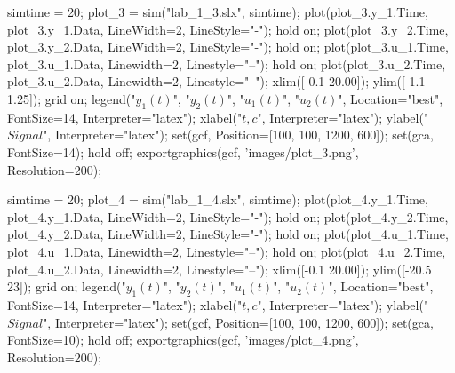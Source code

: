 



\begin{matlabcode}
simtime = 20;
plot_3 = sim("lab_1_3.slx", simtime);
plot(plot_3.y_1.Time, plot_3.y_1.Data, LineWidth=2, LineStyle="-");
hold on;
plot(plot_3.y_2.Time, plot_3.y_2.Data, LineWidth=2, LineStyle="-");
hold on;
plot(plot_3.u_1.Time, plot_3.u_1.Data, Linewidth=2, Linestyle="--");
hold on;
plot(plot_3.u_2.Time, plot_3.u_2.Data, Linewidth=2, Linestyle="--");
xlim([-0.1 20.00]);
ylim([-1.1 1.25]);
grid on;
legend("$y_1(t)$", "$y_2(t)$", "$u_1(t)$", "$u_2(t)$", Location="best",
    FontSize=14, Interpreter="latex");
xlabel("$t, c$", Interpreter="latex");
ylabel("$Signal$", Interpreter="latex");
set(gcf, Position=[100, 100, 1200, 600]);
set(gca, FontSize=14); 
hold off;
exportgraphics(gcf, 'images/plot_3.png', Resolution=200);
\end{matlabcode}




\vspace{1em}
\begin{matlabcode}
simtime = 20;
plot_4 = sim("lab_1_4.slx", simtime);
plot(plot_4.y_1.Time, plot_4.y_1.Data, LineWidth=2, LineStyle="-");
hold on;
plot(plot_4.y_2.Time, plot_4.y_2.Data, LineWidth=2, LineStyle="-");
hold on;
plot(plot_4.u_1.Time, plot_4.u_1.Data, Linewidth=2, Linestyle="--");
hold on;
plot(plot_4.u_2.Time, plot_4.u_2.Data, Linewidth=2, Linestyle="--");
xlim([-0.1 20.00]);
ylim([-20.5 23]);
grid on;
legend("$y_1(t)$", "$y_2(t)$", "$u_1(t)$", "$u_2(t)$", Location="best",
    FontSize=14, Interpreter="latex");
xlabel("$t, c$", Interpreter="latex");
ylabel("$Signal$", Interpreter="latex");
set(gcf, Position=[100, 100, 1200, 600]);
set(gca, FontSize=10); 
hold off;
exportgraphics(gcf, 'images/plot_4.png', Resolution=200);
\end{matlabcode}
